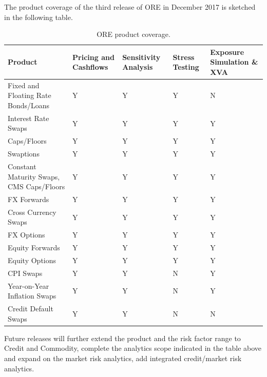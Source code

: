 \documentclass[12pt, a4paper]{article}
\begin{document}
\medskip 
The product coverage of the third release of ORE in December 2017 is sketched in the following table.
\begin{table}[hbt]
\scriptsize
\begin{center}
\begin{tabular}{|l|p{1.5cm}|p{1.5cm}|p{1.2cm}|p{1.5cm}|}
\hline
Product & Pricing and Cashflows & Sensitivity Analysis & Stress Testing & Exposure Simulation \& XVA\\
\hline
Fixed and Floating Rate Bonds/Loans & Y & Y & Y & N \\
\hline
Interest Rate Swaps & Y & Y & Y & Y\\
\hline
Caps/Floors & Y & Y & Y & Y\\
\hline
Swaptions & Y & Y & Y &Y \\
\hline
Constant Maturity Swaps, CMS Caps/Floors & Y & Y & Y & Y\\
\hline
FX Forwards & Y & Y & Y & Y \\
\hline
Cross Currency Swaps & Y & Y & Y & Y \\
\hline
FX Options & Y & Y & Y & Y\\
\hline
Equity Forwards & Y & Y & Y & Y\\
\hline
Equity Options & Y & Y & Y & Y \\
\hline
CPI Swaps & Y & Y & N & Y \\
\hline
Year-on-Year Inflation Swaps & Y & Y & N & Y \\
\hline
Credit Default Swaps & Y & Y & N & N \\
\hline
\end{tabular}
\caption{ORE product coverage.}
\label{tab_coverage}
\end{center}
\end{table}

Future releases will further extend the product and the risk factor range to Credit and Commodity, complete the analytics scope indicated in the table above and expand on the market risk analytics, add integrated credit/market risk analytics. 
\end{document}
